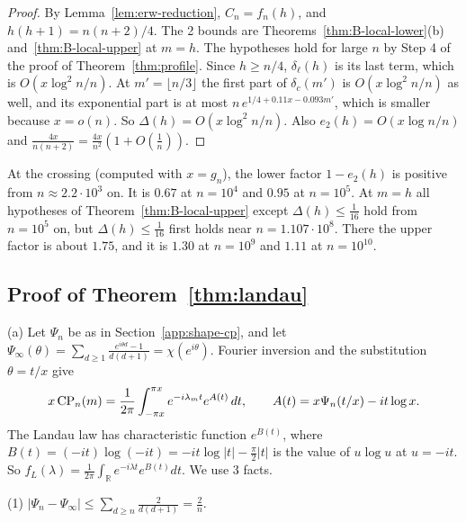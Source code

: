 \begin{proof}
By Lemma~\ref{lem:erw-reduction}, $C_n=f_n(h)$, and $h(h+1)=n(n+2)/4$. The
2 bounds are Theorems~\ref{thm:B-local-lower}(b) and~\ref{thm:B-local-upper}
at $m=h$. The hypotheses hold for large $n$ by Step 4 of the proof of
Theorem~\ref{thm:profile}. Since $h\ge n/4$, $\delta_\ell(h)$ is its last
term, which is $O(x\log^2n/n)$. At $m'=\lfloor n/3\rfloor$ the first part of
$\delta_c(m')$ is $O(x\log^2n/n)$ as well, and its exponential part is at
most $n\,e^{1/4+0.11x-0.093m'}$, which is smaller because $x=o(n)$. So
$\Delta(h)=O(x\log^2n/n)$. Also $e_2(h)=O(x\log n/n)$ and $\frac{4x}{n(n+2)}=\frac{4x}{n^2}(1+O(\frac1n))$.
\end{proof}

At the crossing (computed with $x=g_n$), the lower factor $1-e_2(h)$ is
positive from $n\approx2.2\cdot10^3$ on. It is $0.67$ at $n=10^4$ and $0.95$
at $n=10^5$. At $m=h$ all hypotheses of Theorem~\ref{thm:B-local-upper}
except $\Delta(h)\le\frac1{16}$ hold from $n=10^5$ on, but
$\Delta(h)\le\frac1{16}$ first holds near $n=1.107\cdot10^8$. There the
upper factor is about $1.75$, and it is $1.30$ at $n=10^9$ and $1.11$ at
$n=10^{10}$.

\subsection{Proof of \texorpdfstring{Theorem~\ref{thm:landau}}{Theorem 3.8}}\label{app:shape-landau}

(a) Let $\Psi_n$ be as in Section~\ref{app:shape-cp}, and let
$\Psi_\infty(\theta)=\sum_{d\ge1}\frac{e^{i\theta d}-1}{d(d+1)}=\chi(e^{i\theta})$.
Fourier inversion and the substitution $\theta=t/x$ give
\[
 x\,\mathrm{CP}_n(m)=\frac1{2\pi}\int_{-\pi x}^{\pi x}e^{-i\lambda_mt}e^{A(t)}\,dt,\qquad
 A(t)=x\Psi_n(t/x)-it\log x .
\]
The Landau law has characteristic function $e^{B(t)}$, where
$B(t)=(-it)\log(-it)=-it\log\lvert t\rvert-\frac\pi2\lvert t\rvert$ is the
value of $u\log u$ at $u=-it$. So
$f_L(\lambda)=\frac1{2\pi}\int_{\mathbb R}e^{-i\lambda t}e^{B(t)}dt$. We use
3 facts.

(1) $\lvert\Psi_n-\Psi_\infty\rvert\le\sum_{d\ge n}\frac2{d(d+1)}=\frac2n$.

